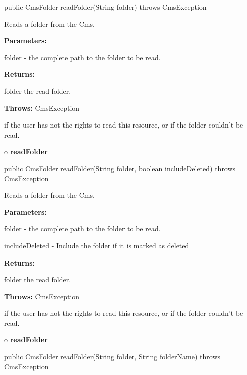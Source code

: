 \begin{PRE}
 public CmsFolder readFolder(String folder) throws CmsException
\end{PRE}

\begin{description}
\htmlDD Reads a folder from the Cms. 

\begin{description}
\item {\bf Parameters:}  

folder - the complete path to the folder to be read.  
\item {\bf Returns:}  

folder the read folder.  
\item {\bf Throws:} CmsException  

if the user has not the rights to read this resource, or if the folder
couldn't be read.  
\end{description}

\end{description}

o {\bf readFolder} 

\begin{PRE}
 public CmsFolder readFolder(String folder,
                             boolean includeDeleted) throws CmsException
\end{PRE}

\begin{description}
\htmlDD Reads a folder from the Cms. 

\begin{description}
\item {\bf Parameters:}  

folder - the complete path to the folder to be read.  

includeDeleted - Include the folder if it is marked as deleted  
\item {\bf Returns:}  

folder the read folder.  
\item {\bf Throws:} CmsException  

if the user has not the rights to read this resource, or if the folder
couldn't be read.  
\end{description}

\end{description}

o {\bf readFolder} 

\begin{PRE}
 public CmsFolder readFolder(String folder,
                             String folderName) throws CmsException
\end{PRE}

